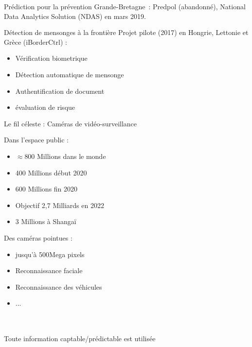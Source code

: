 \begin{frame}{Prédiction pour la prévention}
  Grande-Bretagne~: Predpol (abandonné), National Data Analytics Solution (NDAS) en mars 2019.

\end{frame}

\begin{frame}{Détection de mensonges à la frontière}
  Projet pilote (2017) en Hongrie, Lettonie et Grèce (iBorderCtrl) :
  \begin{itemize}
    \item Vérification biometrique
    \item Détection automatique de mensonge
    \item Authentification de document 
    \item évaluation de risque
  \end{itemize}
\end{frame}

\begin{frame}{Le fil céleste : Caméras de vidéo-surveillance}
  \begin{minipage}[c]{0.49\linewidth}
    Dans l'espace public :
    \begin{itemize}
      \item $\approx$800 Millions dans le monde
      \item 400 Millions début 2020 
      \item 600 Millions fin 2020 
      \item Objectif 2,7 Milliards en 2022
      \item 3 Millions à Shangaï
      \end{itemize}
    \end{minipage}\hfill
  \begin{minipage}[c]{0.49\linewidth}
    Des caméras pointues :
    \begin{itemize}
      \item jusqu'à 500Mega pixels
      \item Reconnaissance faciale
      \item Reconnaissance des véhicules
      \item ...
    \end{itemize}
  \end{minipage}\hfill\\
  \\
  \newline
  Toute information captable/prédictable est utilisée
\end{frame}

